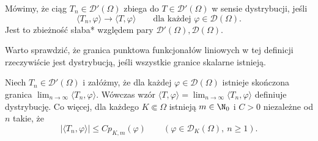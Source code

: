 \begin{definicja}
Mówimy, że ciąg $T_n\in\mathcal D'(\Omega)$ zbiega do
$T\in\mathcal D'(\Omega)$ w sensie dystrybucji, jeśli
\[
 \langle T_n,\varphi\rangle\longrightarrow
 \langle T,\varphi\rangle
 \qquad\text{dla każdej }\varphi\in\mathcal D(\Omega).
\]
Jest to zbieżność słaba* względem pary
$\mathcal D'(\Omega),\mathcal D(\Omega)$.
\end{definicja}

Warto sprawdzić, że granica punktowa funkcjonałów
liniowych w tej definicji rzeczywiście jest
dystrybucją, jeśli wszystkie granice skalarne istnieją.

\begin{stwierdzenie}
Niech $T_n\in\mathcal D'(\Omega)$ i załóżmy, że dla
każdej $\varphi\in\mathcal D(\Omega)$ istnieje skończona
granica $\lim_{n\to\infty}\langle T_n,\varphi\rangle$.
Wówczas wzór
$\langle T,\varphi\rangle=\lim_{n\to\infty}
\langle T_n,\varphi\rangle$ definiuje dystrybucję.
Co więcej, dla każdego $K\Subset\Omega$ istnieją
$m\in\N_0$ i $C>0$ niezależne od $n$ takie, że
\[
 |\langle T_n,\varphi\rangle|\le C p_{K,m}(\varphi)
 \qquad(\varphi\in\mathcal D_K(\Omega),\ n\ge1).
\]
\end{stwierdzenie}
